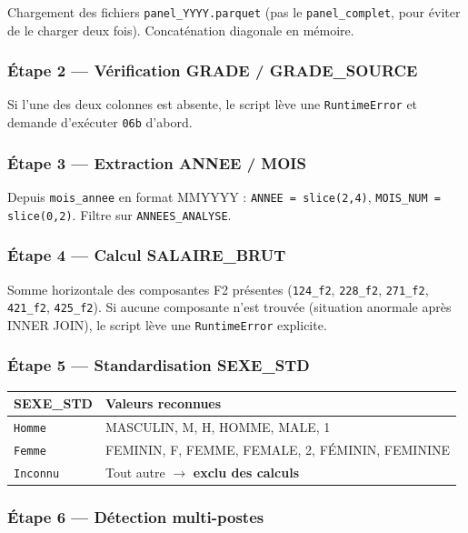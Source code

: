 \documentclass[12pt,a4paper,french]{report}
\begin{document}
Chargement des fichiers \texttt{panel\_YYYY.parquet} (pas le
\texttt{panel\_complet}, pour éviter de le charger deux fois). Concaténation
diagonale en mémoire.

\subsubsection{Étape 2 — Vérification GRADE / GRADE\_SOURCE}

Si l'une des deux colonnes est absente, le script lève une
\texttt{RuntimeError} et demande d'exécuter \texttt{06b} d'abord.

\subsubsection{Étape 3 — Extraction ANNEE / MOIS}

Depuis \texttt{mois\_annee} en format MMYYYY :
\texttt{ANNEE = slice(2,4)}, \texttt{MOIS\_NUM = slice(0,2)}.
Filtre sur \texttt{ANNEES\_ANALYSE}.

\subsubsection{Étape 4 — Calcul SALAIRE\_BRUT}

Somme horizontale des composantes F2 présentes
(\texttt{124\_f2}, \texttt{228\_f2}, \texttt{271\_f2}, \texttt{421\_f2},
\texttt{425\_f2}). Si aucune composante n'est trouvée (situation anormale après
INNER JOIN), le script lève une \texttt{RuntimeError} explicite.

\subsubsection{Étape 5 — Standardisation SEXE\_STD}

\begin{tabularx}{\textwidth}{lX}
  \toprule
  \textbf{SEXE\_STD} & \textbf{Valeurs reconnues} \\
  \midrule
  \texttt{Homme} & MASCULIN, M, H, HOMME, MALE, 1 \\
  \texttt{Femme} & FEMININ, F, FEMME, FEMALE, 2, FÉMININ, FEMININE \\
  \texttt{Inconnu} & Tout autre $\rightarrow$ \textbf{exclu des calculs} \\
  \bottomrule
\end{tabularx}

\subsubsection{Étape 6 — Détection multi-postes}
\end{document}

